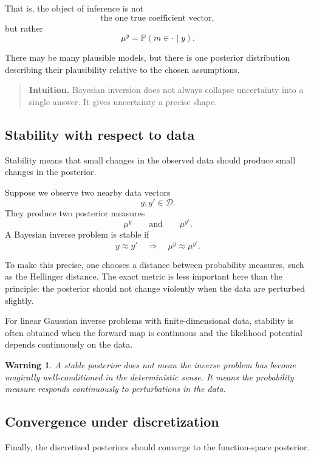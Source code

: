 \documentclass[11pt,a4paper]{book}
\newtheorem{warning}[definition]{Warning}
\newenvironment{intuition}
  {\begin{quote}\textbf{Intuition.}}
  {\end{quote}}
\newcommand{\D}{\mathcal{D}}      %
\newcommand{\post}{\mu^y}
\newcommand{\obs}{y}
\begin{document}
That is, the object of inference is not
\[
    \text{the one true coefficient vector},
\]
but rather
\[
    \post = \mathbb{P}(m\in\cdot \mid \obs).
\]

There may be many plausible models, but there is one posterior distribution
describing their plausibility relative to the chosen assumptions.

\begin{intuition}
Bayesian inversion does not always collapse uncertainty into a single answer.
It gives uncertainty a precise shape.
\end{intuition}

\subsection{Stability with respect to data}

Stability means that small changes in the observed data should produce small
changes in the posterior.

Suppose we observe two nearby data vectors
\[
    \obs,\obs' \in \D.
\]
They produce two posterior measures
\[
    \mu^{\obs}
    \qquad
    \text{and}
    \qquad
    \mu^{\obs'}.
\]
A Bayesian inverse problem is stable if
\[
    \obs \approx \obs'
    \quad\Longrightarrow\quad
    \mu^{\obs} \approx \mu^{\obs'}.
\]

To make this precise, one chooses a distance between probability measures, such
as the Hellinger distance. The exact metric is less important here than the
principle: the posterior should not change violently when the data are perturbed
slightly.

For linear Gaussian inverse problems with finite-dimensional data, stability is
often obtained when the forward map is continuous and the likelihood potential
depends continuously on the data.

\begin{warning}
A stable posterior does not mean the inverse problem has become magically
well-conditioned in the deterministic sense. It means the probability measure
responds continuously to perturbations in the data.
\end{warning}

\subsection{Convergence under discretization}

Finally, the discretized posteriors should converge to the function-space
posterior.
\end{document}
